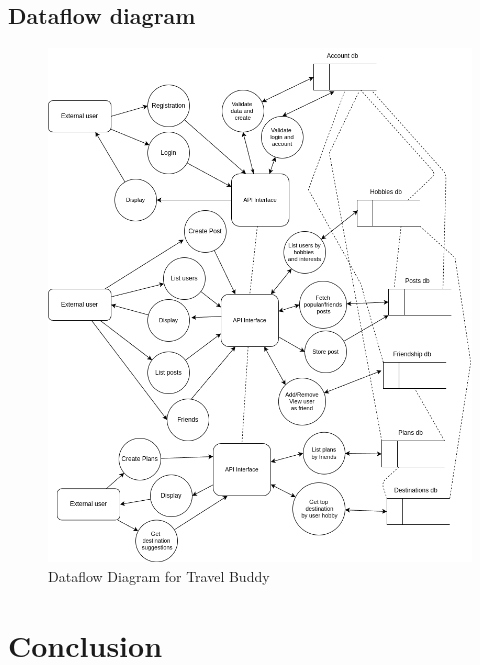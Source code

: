 \documentclass[12pt,a4paper]{report}
\begin{document}
\section{Dataflow diagram}
\begin{figure}
    \centering
    \includegraphics[width=\textwidth, keepaspectratio]{figures/dataflow.png}
    \caption{Dataflow Diagram for Travel Buddy}
    \label{fig:dataflow}
\end{figure}




\chapter{Conclusion}

\raggedright
	
\end{document}
